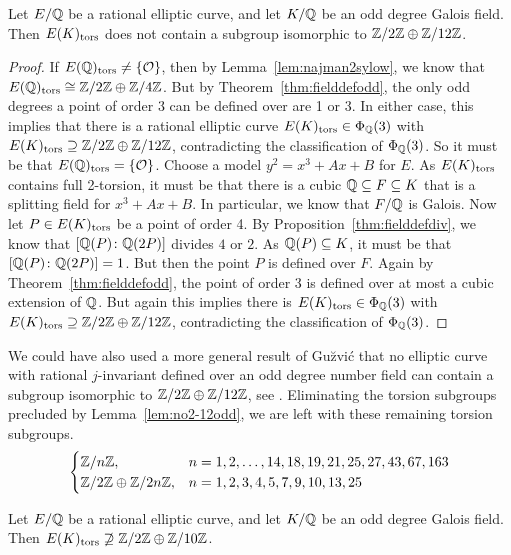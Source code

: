\begin{lem} \label{lem:no2-12odd}
Let $E/\mathbb{Q}$ be a rational elliptic curve, and let $K/\mathbb{Q}$ be an odd degree Galois field. Then $E(K)_{\text{tors}}$ does not contain a subgroup isomorphic to $\mathbb{Z}/2\mathbb{Z} \oplus \mathbb{Z}/12\mathbb{Z}$.
\end{lem}

\begin{proof}
If $E(\mathbb{Q})_{\text{tors}} \neq \{ \mathcal{O} \}$, then by Lemma~\ref{lem:najman2sylow}, we know that $E(\mathbb{Q})_{\text{tors}} \cong \mathbb{Z}/2\mathbb{Z} \oplus \mathbb{Z}/4\mathbb{Z}$. But by Theorem~\ref{thm:fielddefodd}, the only odd degrees a point of order 3 can be defined over are 1 or 3. In either case, this implies that there is a rational elliptic curve $E(K)_{\text{tors}} \in \Phi_{\mathbb{Q}}(3)$ with $E(K)_{\text{tors}} \supseteq \mathbb{Z}/2\mathbb{Z} \oplus \mathbb{Z}/12\mathbb{Z}$, contradicting the classification of $\Phi_{\mathbb{Q}}(3)$. So it must be that $E(\mathbb{Q})_{\text{tors}} = \{ \mathcal{O} \}$. Choose a model $y^2= x^3 + Ax + B$ for $E$. As $E(K)_{\text{tors}}$ contains full 2-torsion, it must be that there is a cubic $\mathbb{Q} \subseteq F \subseteq K$ that is a splitting field for $x^3 + Ax + B$. In particular, we know that $F/\mathbb{Q}$ is Galois. Now let $P \in E(K)_{\text{tors}}$ be a point of order 4. By Proposition~\ref{thm:fielddefdiv}, we know that $[\mathbb{Q}(P) \colon \mathbb{Q}(2P)]$ divides $4$ or $2$. As $\mathbb{Q}(P) \subseteq K$, it must be that $[\mathbb{Q}(P) \colon \mathbb{Q}(2P)]= 1$. But then the point $P$ is defined over $F$. Again by Theorem~\ref{thm:fielddefodd}, the point of order 3 is defined over at most a cubic extension of $\mathbb{Q}$. But again this implies there is $E(K)_{\text{tors}} \in \Phi_{\mathbb{Q}}(3)$ with $E(K)_{\text{tors}} \supseteq \mathbb{Z}/2\mathbb{Z} \oplus \mathbb{Z}/12\mathbb{Z}$, contradicting the classification of $\Phi_{\mathbb{Q}}(3)$.
\end{proof}


We could have also used a more general result of Gu{\u{z}}vi\'c that no elliptic curve with rational $j$-invariant defined over an odd degree number field can contain a subgroup isomorphic to $\mathbb{Z}/2\mathbb{Z} \oplus \mathbb{Z}/12\mathbb{Z}$, see \cite[Lem.~3.10]{guzvic19}. Eliminating the torsion subgroups precluded by Lemma~\ref{lem:no2-12odd}, we are left with these remaining torsion subgroups. 
	\[
	\begin{cases}
	\mathbb{Z}/n\mathbb{Z}, & n= 1, 2, \ldots, 14, 18, 19, 21, 25, 27, 43, 67, 163 \\
	\mathbb{Z}/2\mathbb{Z} \oplus \mathbb{Z}/2n\mathbb{Z}, & n= 1, 2, 3, 4, 5, 7, 9, 10, 13, 25
	\end{cases}
	\]


\begin{lem} \label{lem:no2-10oddgal}
Let $E/\mathbb{Q}$ be a rational elliptic curve, and let $K/\mathbb{Q}$ be an odd degree Galois field. Then $E(K)_{\text{tors}} \not\supseteq \mathbb{Z}/2\mathbb{Z} \oplus \mathbb{Z}/10\mathbb{Z}$.
\end{lem}


